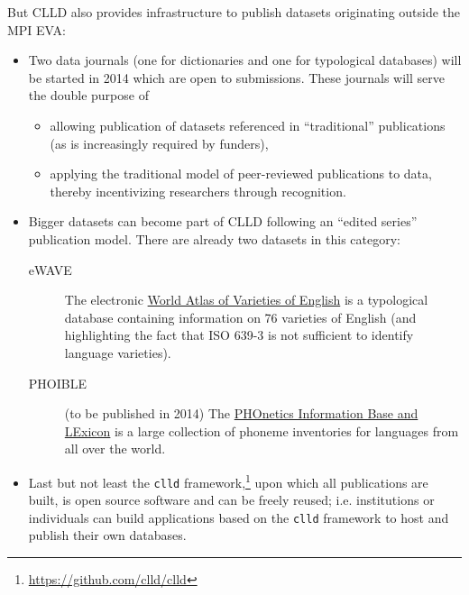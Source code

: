 \documentclass[a4paper,10pt]{article}
\begin{document}
But CLLD also provides infrastructure to publish datasets originating outside the MPI EVA:
\begin{itemize}
\item Two data journals (one for dictionaries and one for typological databases) will be started
in 2014 which are open to submissions. These journals will serve the double purpose of
\begin{itemize}
\item allowing publication of datasets referenced in ``traditional'' publications (as is
increasingly required by funders),
\item applying the traditional model of peer-reviewed publications to data, thereby incentivizing
researchers through recognition.
\end{itemize}
\item Bigger datasets can become part of CLLD following an ``edited series'' publication model.
There are already two datasets in this category:
\begin{description}
\item[eWAVE] The electronic \href{http://ewave-atlas.org/}{World Atlas of Varieties of English} is a typological database containing information on 76 varieties of English (and highlighting the fact that ISO 639-3 is not sufficient to identify language varieties).
\item[PHOIBLE] (to be published in 2014) The \href{http://phoible.org}{PHOnetics Information Base and LExicon} is a large collection of phoneme inventories for languages from all over the world.
\end{description}
\item Last but not least the \texttt{clld} framework,\footnote{\url{https://github.com/clld/clld}}
upon which all publications are built, is open source software and can be freely reused; i.e.
institutions or individuals can build applications based on the \texttt{clld} framework to
host and publish their own databases.
\end{itemize}
\end{document}
